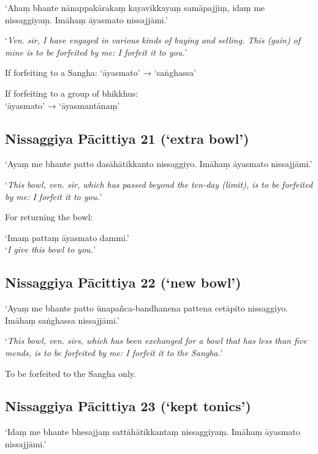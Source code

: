 ‘Ahaṃ bhante nānappakārakaṃ kayavikkayaṃ samāpajjiṃ, idaṃ me nissaggiyaṃ. Imāhaṃ
āyasmato nissajjāmi.’

‘\emph{Ven. sir, I have engaged in various kinds of buying and selling. This
  (gain) of mine is to be forfeited by me: I forfeit it to you.}’ 

If forfeiting to a Sangha: ‘āyasmato’ → ‘saṅghassa’

If forfeiting to a group of bhikkhus:\\
‘āyasmato’ → ‘āyasmantānaṃ’


\subsection[NP 21 (‘extra bowl’)]{Nissaggiya Pācittiya 21 (‘extra bowl’)}

‘Ayaṃ me bhante patto dasāhātikkanto nissaggiyo. Imāhaṃ āyasmato nissajjāmi.’

‘\emph{This bowl, ven. sir, which has passed beyond the ten-day (limit), is to be
  forfeited by me: I forfeit it to you.}’


For returning the bowl:

‘Imaṃ pattaṃ āyasmato dammi.’\\
‘\emph{I give this bowl to you.}’ 

\subsection[NP 22 (‘new bowl’)]{Nissaggiya Pācittiya 22 (‘new bowl’)}

‘Ayaṃ me bhante patto ūnapañca-bandhanena pattena cetāpito nissaggiyo. Imāhaṃ
saṅghassa nissajjāmi.’

‘\emph{This bowl, ven. sirs, which has been exchanged for a bowl that has less
  than five mends, is to be forfeited by me: I forfeit it to the Sangha.}’

To be forfeited to the Sangha only. 

\subsection[NP 23 (‘kept tonics’)]{Nissaggiya Pācittiya 23 (‘kept tonics’)}

‘Idaṃ me bhante bhesajjaṃ sattāhātikkantaṃ nissaggiyaṃ. Imāhaṃ āyasmato
nissajjāmi.’

